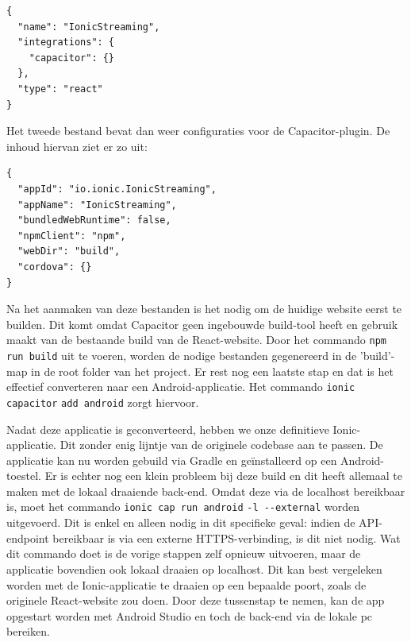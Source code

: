 \begin{mdframed}[backgroundcolor=bg]
  \begin{verbatim}
{
  "name": "IonicStreaming",
  "integrations": {
    "capacitor": {}
  },
  "type": "react"
}
  \end{verbatim}
\end{mdframed}

Het tweede bestand bevat dan weer configuraties voor de Capacitor-plugin. De inhoud hiervan ziet er zo uit:

\begin{mdframed}[backgroundcolor=bg]
  \begin{verbatim}
{
  "appId": "io.ionic.IonicStreaming",
  "appName": "IonicStreaming",
  "bundledWebRuntime": false,
  "npmClient": "npm",
  "webDir": "build",
  "cordova": {}
}
  \end{verbatim}
\end{mdframed}

Na het aanmaken van deze bestanden is het nodig om de huidige website eerst te builden. Dit komt omdat Capacitor geen ingebouwde build-tool heeft en gebruik maakt van de bestaande build van de React-website. Door het commando \verb|npm run build| uit te voeren, worden de nodige bestanden gegenereerd in de 'build'-map in de root folder van het project. Er rest nog een laatste stap en dat is het effectief converteren naar een Android-applicatie. Het commando \verb|ionic capacitor| \verb|add android| zorgt hiervoor.

Nadat deze applicatie is geconverteerd, hebben we onze definitieve Ionic-applicatie. Dit zonder enig lijntje van de originele codebase aan te passen. De applicatie kan nu worden gebuild via Gradle en geïnstalleerd op een Android-toestel. Er is echter nog een klein probleem bij deze build en dit heeft allemaal te maken met de lokaal draaiende back-end. Omdat deze via de localhost bereikbaar is, moet het commando \verb|ionic cap run android| \verb|-l --external| worden uitgevoerd. Dit is enkel en alleen nodig in dit specifieke geval: indien de API-endpoint bereikbaar is via een externe HTTPS-verbinding, is dit niet nodig. Wat dit commando doet is de vorige stappen zelf opnieuw uitvoeren, maar de applicatie bovendien ook lokaal draaien op localhost. Dit kan best vergeleken worden met de Ionic-applicatie te draaien op een bepaalde poort, zoals de originele React-website zou doen. Door deze tussenstap te nemen, kan de app opgestart worden met Android Studio en toch de back-end via de lokale pc bereiken.

